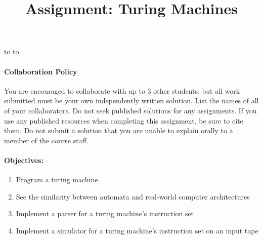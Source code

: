 \documentclass[10pt]{article}
\newcommand{\handout}{
   \renewcommand{\thepage}{H\hnumber-\arabic{page}}
   \noindent
   \begin{center}
      \vbox{
    \hbox to \columnwidth {\sc{\course} --- \prof \hfill}
    \vspace{-2mm}
    \hbox to \columnwidth {\sc due \MakeLowercase{\duedate} \duelocation\hfill {\Huge\color{mdb}H\hnumber.\yourid}}
      }
   \end{center}
   \vspace*{2mm}
}
\begin{document}
\thispagestyle{empty}
\handout
\title{Assignment: Turing Machines}
\date{\vspace{-6em}}


\paragraph{Collaboration Policy} You are encouraged to collaborate with up to 3 other students, but all work submitted must be your own independently written solution. List the names of all of your collaborators. Do not seek published solutions for any assignments. If you use any published resources when completing this assignment, be sure to cite them. Do not submit a solution that you are unable to explain orally to a member of the course staff.

\paragraph{Objectives:}
\begin{enumerate}[nosep]
    \item Program a turing machine
    \item See the similarity between automata and real-world computer architectures
    \item Implement a parser for a turing machine's instruction set
    \item Implement a simulator for a turing machine's instruction set on an input tape
\end{enumerate}
\end{document}
